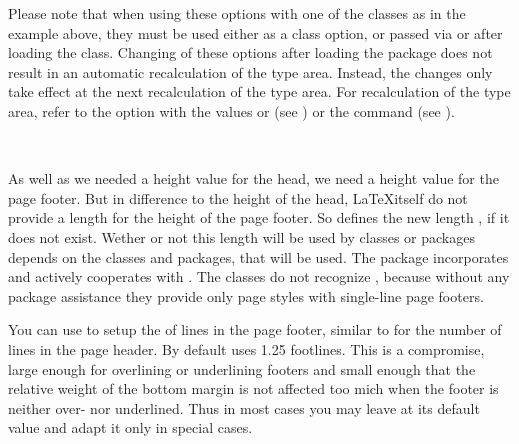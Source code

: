 Please note that when using these options with one of the
{\KOMAScript} classes as in the example above, they must be used
either as a class option, or passed via  or
 after loading the class. Changing of these options
after loading the  package does not result in an
automatic recalculation of the type area. Instead, the changes only
take effect at the next recalculation of the type area. For
recalculation of the type area, refer to the  option with
the values  or  (see
) or the
 command (see
).%
%
%

\begin{Declaration}
  \\
\end{Declaration}
%
%
As well as we needed a height value for
the head, we need a height value for the page footer. But in difference to the
height of the head, \LaTeX itself do not provide a length for the height of
the page footer. So  defines the new length
, if it does not
exist. Wether or not this length will be used by classes or packages depends
on the classes and packages, that will be used. The \KOMAScript{} package
 incorporates  and actively
cooperates with . The \KOMAScript{} classes do not recognize
, because without any package assistance they provide only
page styles with single-line page footers.

You can use  to setup the  of lines in the
page footer, similar to  for the number of lines in the page
header. By default  uses 1.25 footlines. This is a
compromise, large enough for overlining or underlining footers and small
enough that the relative weight of the bottom margin is not affected too mich
when the footer is neither over- nor underlined. Thus in most cases you may
leave  at its default value and adapt it only in special
cases.

